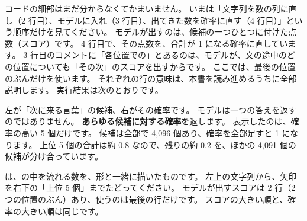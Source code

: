 
コードの細部はまだ分からなくてかまいません。
いまは「文字列を数の列に直し（2 行目）、モデルに入れ（3 行目）、出てきた数を確率に直す（4 行目）」という順序だけを見てください。
モデルが出すのは、候補の一つひとつに付けた点数（スコア）です。
4 行目で、その点数を、合計が 1 になる確率に直しています。
3 行目のコメントに「各位置での」とあるのは、モデルが、文の途中のどの位置についても「その次」のスコアを出すからです。
ここでは、最後の位置のぶんだけを使います。
それぞれの行の意味は、本書を読み進めるうちに全部説明します。
実行結果は次のとおりです。


左が「次に来る言葉」の候補、右がその確率です。
モデルは一つの答えを返すのではありません。
\textbf{あらゆる候補に対する確率}を返します。
表示したのは、確率の高い 5 個だけです。
候補は全部で 4,096 個あり、確率を全部足すと 1 になります。
上位 5 個の合計は約 0.8 なので、残りの約 0.2 を、ほかの 4,091 個の候補が分け合っています。

は、の中を流れる数を、形と一緒に描いたものです。
左上の文字列から、矢印を右下の「上位 5 個」までたどってください。
モデルが出すスコアは 2 行（2 つの位置のぶん）あり、使うのは最後の行だけです。
スコアの大きい順と、確率の大きい順は同じです。

